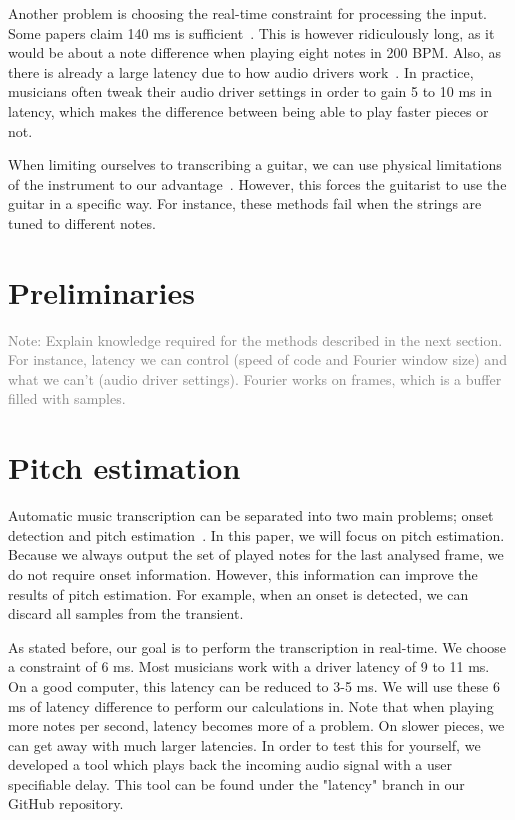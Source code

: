 \documentclass[10pt,twocolumn]{article}
\begin{document}
Another problem is choosing the real-time constraint for processing the input. Some papers claim 140 ms is sufficient~\cite{sloomboi}. This is however ridiculously long, as it would be about a note difference when playing eight notes in 200 BPM. Also, as there is already a large latency due to how audio drivers work~\cite{os}. In practice, musicians often tweak their audio driver settings in order to gain 5 to 10 ms in latency, which makes the difference between being able to play faster pieces or not.

When limiting ourselves to transcribing a guitar, we can use physical limitations of the instrument to our advantage~\cite{physical}. However, this forces the guitarist to use the guitar in a specific way. For instance, these methods fail when the strings are tuned to different notes.


\section{Preliminaries}
\textcolor{gray}{Note: Explain knowledge required for the methods described in the next section. For instance, latency we can control (speed of code and Fourier window size) and what we can't (audio driver settings). Fourier works on frames, which is a buffer filled with samples.}


\section{Pitch estimation}
Automatic music transcription can be separated into two main problems; onset detection and pitch estimation~\cite{survey2}. In this paper, we will focus on pitch estimation. Because we always output the set of played notes for the last analysed frame, we do not require onset information. However, this information can improve the results of pitch estimation. For example, when an onset is detected, we can discard all samples from the transient.

As stated before, our goal is to perform the transcription in real-time. We choose a constraint of 6 ms. Most musicians work with a driver latency of 9 to 11 ms. On a good computer, this latency can be reduced to 3-5 ms. We will use these 6 ms of latency difference to perform our calculations in. Note that when playing more notes per second, latency becomes more of a problem. On slower pieces, we can get away with much larger latencies. In order to test this for yourself, we developed a tool which plays back the incoming audio signal with a user specifiable delay. This tool can be found under the "latency" branch in our GitHub repository. 
\end{document}
